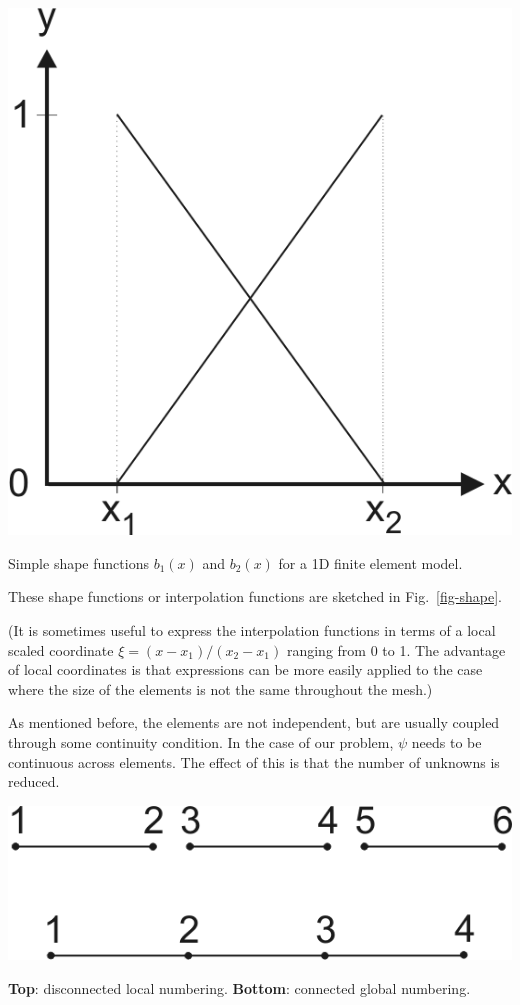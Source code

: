 \begin{marginfigure}[-5cm]
\centering
\includegraphics{numeric/figures/interpol}
\caption{Simple shape functions $b_1(x)$ and $b_2(x)$ for a 1D finite element model.}
\label{fig-shape}
\end{marginfigure}

These shape functions or interpolation functions are sketched in Fig.~\ref{fig-shape}.

(It is sometimes useful to express the interpolation functions in terms of a local scaled coordinate $\xi=(x-x_1)/(x_2-x_1)$ ranging from 0 to 1. The advantage of local coordinates is that expressions can be more easily applied to the case where the size of the elements is not the same throughout the mesh.)


As mentioned before, the elements are not independent, but are usually coupled through some continuity condition. In the case of our problem, $\psi$ needs to be continuous across elements. The effect of this is that the number of unknowns is reduced.

\begin{marginfigure}[0.5cm]
\centering
\includegraphics{numeric/figures/connect}
\caption{\textbf{Top}: disconnected local numbering. \textbf{Bottom}: connected global numbering.}
\label{fig-connect}
\end{marginfigure}

